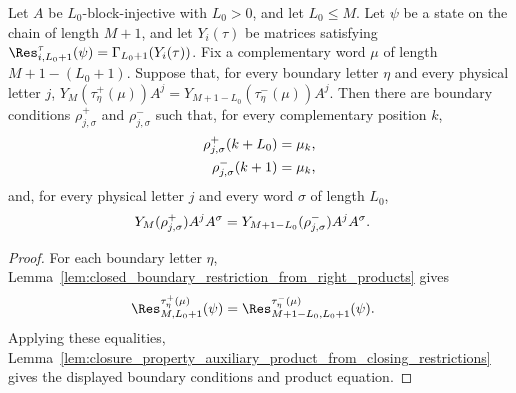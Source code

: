 \begin{lemma}
    \label{lem:closure_property_auxiliary_product_from_right_products}
    \leanok
    Let $A$ be $L_0$-block-injective with $L_0>0$, and let $L_0\le M$.
    Let $\psi$ be a state on the chain of length $M+1$, and let
    $Y_i(\tau)$ be matrices satisfying
    $\Res^{\tau}_{i,L_0+1}(\psi)=\Gamma_{L_0+1}(Y_i(\tau))$.
    Fix a complementary word $\mu$ of length $M+1-(L_0+1)$.
    Suppose that, for every boundary letter $\eta$ and every physical letter
    $j$,
    $Y_M(\tau^+_\eta(\mu))A^j = Y_{M+1-L_0}(\tau^-_\eta(\mu))A^j$.
    Then there are boundary conditions $\rho^+_{j,\sigma}$ and
    $\rho^-_{j,\sigma}$ such that, for every complementary position $k$,
    \begin{align}
        \rho^+_{j,\sigma}(k+L_0)
         & =
        \mu_k,
        \notag \\
        \rho^-_{j,\sigma}(k+1)
         & =
        \mu_k,
        \notag
    \end{align}
    and, for every physical letter $j$ and every word $\sigma$ of length
    $L_0$,
    \begin{align}
        Y_M(\rho^+_{j,\sigma})A^jA^\sigma
         & =
        Y_{M+1-L_0}(\rho^-_{j,\sigma})A^jA^\sigma.
        \notag
    \end{align}
\end{lemma}

\begin{proof}
    \leanok
    For each boundary letter $\eta$,
    Lemma~\ref{lem:closed_boundary_restriction_from_right_products} gives
    \begin{align}
        \Res^{\tau^+_\eta(\mu)}_{M,L_0+1}(\psi)
         & =
        \Res^{\tau^-_\eta(\mu)}_{M+1-L_0,L_0+1}(\psi).
        \notag
    \end{align}
    Applying these equalities,
    Lemma~\ref{lem:closure_property_auxiliary_product_from_closing_restrictions}
    gives the displayed boundary conditions and product equation.
\end{proof}

